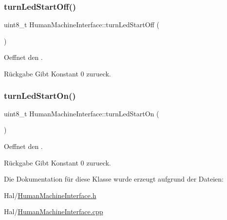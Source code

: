 \subsubsection{\texorpdfstring{turn\+Led\+Start\+Off()}{turnLedStartOff()}}
{\footnotesize\ttfamily uint8\+\_\+t Human\+Machine\+Interface\+::turn\+Led\+Start\+Off (\begin{DoxyParamCaption}{ }\end{DoxyParamCaption})}

Oeffnet den .

\begin{DoxyReturn}{Rückgabe}
Gibt Konstant 0 zurueck. 
\end{DoxyReturn}
\hypertarget{class_human_machine_interface_a46dca7b3435dc4b20a2db67b301cb36d}{}\label{class_human_machine_interface_a46dca7b3435dc4b20a2db67b301cb36d} 
\subsubsection{\texorpdfstring{turn\+Led\+Start\+On()}{turnLedStartOn()}}
{\footnotesize\ttfamily uint8\+\_\+t Human\+Machine\+Interface\+::turn\+Led\+Start\+On (\begin{DoxyParamCaption}{ }\end{DoxyParamCaption})}

Oeffnet den .

\begin{DoxyReturn}{Rückgabe}
Gibt Konstant 0 zurueck. 
\end{DoxyReturn}


Die Dokumentation für diese Klasse wurde erzeugt aufgrund der Dateien\+:\begin{DoxyCompactItemize}
\item 
Hal/\hyperlink{_human_machine_interface_8h}{Human\+Machine\+Interface.\+h}\item 
Hal/\hyperlink{_human_machine_interface_8cpp}{Human\+Machine\+Interface.\+cpp}\end{DoxyCompactItemize}
